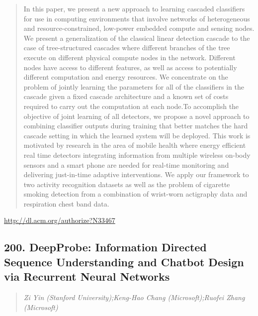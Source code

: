 \documentclass{article}
\begin{document}
\begin{quote}
In this paper, we present a new approach to learning cascaded classifiers for use in computing environments that involve networks of heterogeneous and resource-constrained, low-power embedded compute and sensing nodes. We present a generalization of the classical linear detection cascade to the case of tree-structured cascades where different branches of the tree execute on different physical compute nodes in the network. Different nodes have access to different features, as well as access to potentially different computation and energy resources. We concentrate on the problem of jointly learning the parameters for all of the classifiers in the cascade given a fixed cascade architecture and a known set of costs required to carry out the computation at each node.To accomplish the objective of joint learning of all detectors, we propose a novel approach to combining classifier outputs during training that better matches the hard cascade setting in which the learned system will be deployed. This work is motivated by research in the area of mobile health where energy efficient real time detectors integrating information from multiple wireless on-body sensors and a smart phone are needed for real-time monitoring and delivering just-in-time adaptive interventions. We apply our framework to two activity recognition datasets as well as the problem of cigarette smoking detection from a combination of wrist-worn actigraphy data and respiration chest band data.
\end{quote}

\href{http://dl.acm.org/authorize?N33467}{http://dl.acm.org/authorize?N33467}

\subsection{200. DeepProbe: Information Directed Sequence Understanding and Chatbot Design via Recurrent Neural Networks}

\begin{quote}
\footnotesize{\textit{Zi Yin (Stanford University);Keng-Hao Chang (Microsoft);Ruofei Zhang (Microsoft)}}

\end{quote}
\end{document}
